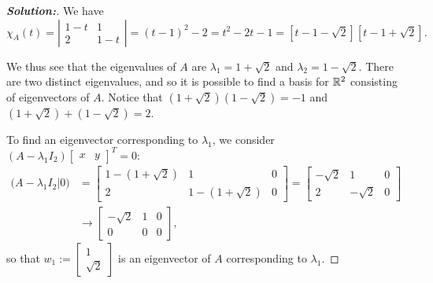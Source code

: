 \documentclass[a4paper]{amsart}
\theoremstyle{definition}
\newenvironment{solution}{\begin{proof}[\textbf{Solution:}] \vphantom{u}}{\end{proof}}
\begin{document}
\begin{solution}
 \def\Fiba{\textstyle 1+\sqrt{2}}
 \def\Fibb{\textstyle 1-\sqrt{2}}

 We have
 \[
 \chi_A(t) = \left|  \begin{array}{cc}1-t & 1\\2& 1-t
 \end{array} \right| = (t-1)^2 -2 = t^2 - 2t - 1 =
 \left[t - 1-\sqrt{2}\right]\left[t -
 1+\sqrt{2}\right].
 \]

 We thus see that the eigenvalues of $A$ are $\lambda_1 = \Fiba$ and
 $\lambda_2 = \Fibb$. There are two distinct eigenvalues, and so it
 is possible to find a basis for ${\mathbb{R}}^2$ consisting of eigenvectors of
 $A$. Notice that $(\Fiba)(\Fibb) = -1$ and
 $(\Fiba) + (\Fibb) = 2$.

 To find an eigenvector corresponding to $\lambda_1$, we consider
 $(A - \lambda_1I_2)\left[
 \begin{array}{cc}x & y
 \end{array} \right]^T = 0$:
 \begin{align*}
 \big(A - \lambda_1I_2|0\big) &= \left[ \begin{array}{cc|c} 1 -
 (\Fiba) & 1& 0\\ 2 &1 -(\Fiba) & 0\end{array} \right] = \left[
 \begin{array}{cc|c} -\sqrt{2} & 1 & 0\\ 2 & -\sqrt{2} & 0
 \end{array} \right]\\ & \to \left[ \begin{array}{cc|c}
 -\sqrt{2} & 1 & 0\\0 & 0 & 0
 \end{array} \right],
 \end{align*}
 so that $w_1 := \left[ \begin{array}{c}1\\ \sqrt{2}
 \end{array} \right]$ is an eigenvector of $A$ corresponding to
 $\lambda_1$.


\end{solution}
\end{document}
